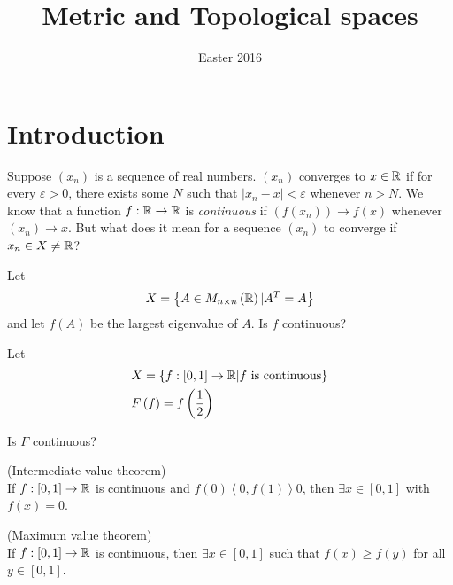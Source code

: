 \documentclass[a4paper]{article}
\begin{document}
\title{Metric and Topological spaces}
\date{Easter 2016}

\maketitle

\newpage

\tableofcontents

\newpage

\section{Introduction}
Suppose $\left(x_n\right)$ is a sequence of real numbers. $\left(x_n\right)$ converges to $x\in \mathbb{R}$ if for every $\varepsilon>0$, there exists some $N$ such that $|x_n-x|<\varepsilon$ whenever $n>N$. We know that a function $f:\mathbb{R} \to \mathbb{R}$ is \emph{continuous} if $\left(f\left(x_n\right)\right)\to f\left(x\right)$ whenever $\left(x_n\right) \to x$. But what does it mean for a sequence $\left(x_n\right)$ to converge if $x_n\in X \neq \mathbb{R}$?

\begin{eg}
Let
\begin{equation*}
\begin{aligned}
X=\left\{A\in M_{n\times n} \left(\mathbb{R}\right) | A^T =A\right\}
\end{aligned}
\end{equation*}
and let $f\left(A\right)$ be the largest eigenvalue of $A$. Is $f$ continuous?
\end{eg}

\begin{eg}
Let
\begin{equation*}
\begin{aligned}
&X=\left\{f:\left[0,1\right] \to \mathbb{R} | f  \text{ is continuous} \right\} \\
&F\left(f\right) = f\left(\frac{1}{2}\right)
\end{aligned}
\end{equation*}
\end{eg}
Is $F$ continuous?

\begin{thm} (Intermediate value theorem)\\
If $f:\left[0,1\right]\to \mathbb{R}$ is continuous and $f\left(0\right)\left<0, f\left(1\right)\right>0$, then $\exists x \in \left[0,1\right]$ with $f\left(x\right)=0$.
\end{thm}

\begin{thm} (Maximum value theorem)\\
If $f:\left[0,1\right] \to \mathbb{R}$ is continuous, then $\exists x \in \left[0,1\right]$ such that $f\left(x\right) \geq f\left(y\right)$ for all $y\in\left[0,1\right]$.
\end{thm}
\end{document}
